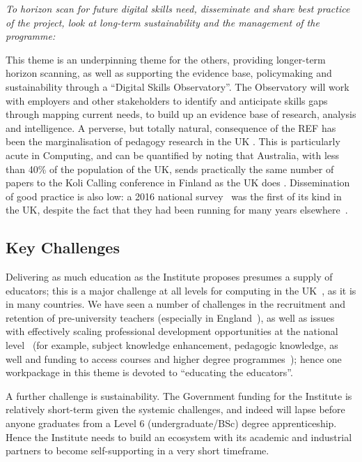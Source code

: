 \documentclass[conference]{IEEEtran}
\begin{document}
{\emph{To horizon scan for future digital skills need, disseminate and
share best practice of the project, look at long-term sustainability
and the management of the programme:}}\newline

\noindent This theme is an underpinning theme for the others,
providing longer-term horizon scanning, as well as supporting the
evidence base, policymaking and sustainability through a ``Digital
Skills Observatory''. The Observatory will work with employers and
other stakeholders to identify and anticipate skills gaps through
mapping current needs, to build up an evidence base of research,
analysis and intelligence.  A perverse, but totally natural,
consequence of the REF has been the marginalisation of pedagogy
research in the UK \cite{Cottonetal2018a}. This is particularly acute
in Computing, and can be quantified by noting that Australia, with
less than 40\% of the population of the UK, sends practically the same
number of papers to the Koli Calling conference in Finland as the UK
does \cite{Simon2016a}. Dissemination of good practice is also low: a
2016 national survey~\cite{murphy-et-al:programming2017} was the first
of its kind in the UK, despite the fact that they had been running for
many years elsewhere~\cite{simon-et-al:sigcse2018}.

\subsection{Key Challenges}

Delivering as much education as the Institute proposes presumes a
supply of educators; this is a major challenge at all levels for
computing in the UK~\cite{brown-et-al:toce2014}, as it is in many
countries. We have seen a number of challenges in the recruitment and
retention of pre-university teachers (especially in
England~\cite{sentance+waite:2018}), as well as issues with
effectively scaling professional development opportunities at the
national level~\cite{sentance+csizmadia:2017} (for example, subject
knowledge enhancement, pedagogic knowledge, as well and funding to
access courses and higher degree
programmes~\cite{sentance-et-al-wipsce2012}); hence one workpackage in
this theme is devoted to ``educating the educators''.

A further challenge is sustainability. The Government funding for the
Institute is relatively short-term given the systemic challenges, and
indeed will lapse before anyone graduates from a Level 6
(undergraduate/BSc) degree apprenticeship. Hence the Institute needs
to build an ecosystem with its academic and industrial partners to
become self-supporting in a very short timeframe.
\end{document}
